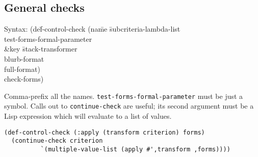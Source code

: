 \subsection{General checks}
{\ttfamily\begin{tabbing}
\textrm{Syntax: 
}(de\=f-control-check (na\=me \=subcriteria-lambda-list
\\ \>\> \> test-forms-formal-parameter
\\ \>\> \&key \=stack-transformer
\\ \>\> \> blurb-format
\\ \>\> \> full-format)
\\ \> check-forms)
\end{tabbing}}
Comma-prefix all the names.  \texttt{test-forms-formal-parameter} must
be just a symbol.  Calls out to \texttt{continue-check} are useful;
its second argument must be a Lisp expression which will evaluate to a
list of values.
\begin{verbatim}
(def-control-check (:apply (transform criterion) forms)
  (continue-check criterion
		  `(multiple-value-list (apply #',transform ,forms))))
\end{verbatim}
\par{}

